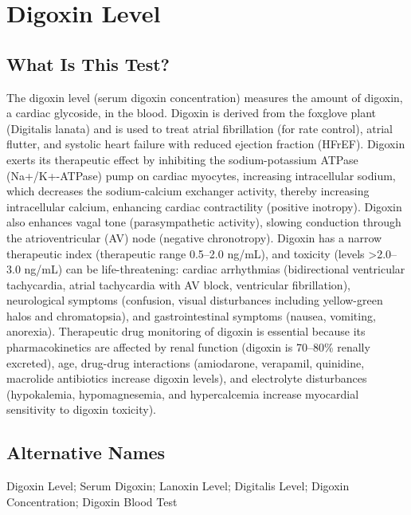 \chapter{Digoxin Level}

\section*{What Is This Test?}
The digoxin level (serum digoxin concentration) measures the amount of digoxin, a cardiac glycoside, in the blood. Digoxin is derived from the foxglove plant (Digitalis lanata) and is used to treat atrial fibrillation (for rate control), atrial flutter, and systolic heart failure with reduced ejection fraction (HFrEF). Digoxin exerts its therapeutic effect by inhibiting the sodium-potassium ATPase (Na+/K+-ATPase) pump on cardiac myocytes, increasing intracellular sodium, which decreases the sodium-calcium exchanger activity, thereby increasing intracellular calcium, enhancing cardiac contractility (positive inotropy). Digoxin also enhances vagal tone (parasympathetic activity), slowing conduction through the atrioventricular (AV) node (negative chronotropy). Digoxin has a narrow therapeutic index (therapeutic range 0.5--2.0 ng/mL), and toxicity (levels >2.0--3.0 ng/mL) can be life-threatening: cardiac arrhythmias (bidirectional ventricular tachycardia, atrial tachycardia with AV block, ventricular fibrillation), neurological symptoms (confusion, visual disturbances including yellow-green halos and chromatopsia), and gastrointestinal symptoms (nausea, vomiting, anorexia). Therapeutic drug monitoring of digoxin is essential because its pharmacokinetics are affected by renal function (digoxin is 70--80\% renally excreted), age, drug-drug interactions (amiodarone, verapamil, quinidine, macrolide antibiotics increase digoxin levels), and electrolyte disturbances (hypokalemia, hypomagnesemia, and hypercalcemia increase myocardial sensitivity to digoxin toxicity).

\section*{Alternative Names}
Digoxin Level; Serum Digoxin; Lanoxin Level; Digitalis Level; Digoxin Concentration; Digoxin Blood Test

